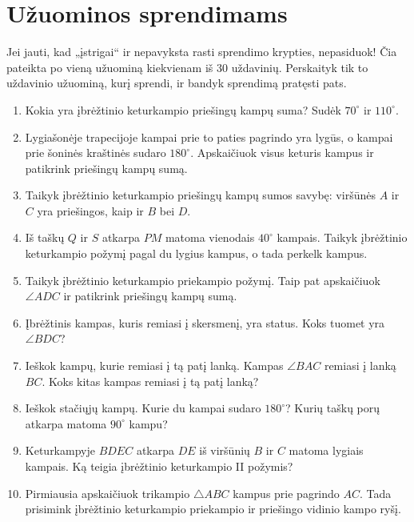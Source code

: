 \documentclass[11pt,a4paper]{scrartcl}
\begin{document}
\newpage
\section{Užuominos sprendimams}

Jei jauti, kad „įstrigai“ ir nepavyksta rasti sprendimo krypties, nepasiduok! Čia pateikta po vieną užuominą kiekvienam iš 30 uždavinių. Perskaityk tik to uždavinio užuominą, kurį sprendi, ir bandyk sprendimą pratęsti pats.

\begin{enumerate}
    \renewcommand{\labelenumi}{\textbf{\theenumi.}}

    \item Kokia yra įbrėžtinio keturkampio priešingų kampų suma? Sudėk $70^\circ$ ir $110^\circ$.
    \item Lygiašonėje trapecijoje kampai prie to paties pagrindo yra lygūs, o kampai prie šoninės kraštinės sudaro $180^\circ$. Apskaičiuok visus keturis kampus ir patikrink priešingų kampų sumą.
    \item Taikyk įbrėžtinio keturkampio priešingų kampų sumos savybę: viršūnės $A$ ir $C$ yra priešingos, kaip ir $B$ bei $D$.
    \item Iš taškų $Q$ ir $S$ atkarpa $PM$ matoma vienodais $40^\circ$ kampais. Taikyk įbrėžtinio keturkampio požymį pagal du lygius kampus, o tada perkelk kampus.
    \item Taikyk įbrėžtinio keturkampio priekampio požymį. Taip pat apskaičiuok $\angle ADC$ ir patikrink priešingų kampų sumą.
    \item Įbrėžtinis kampas, kuris remiasi į skersmenį, yra status. Koks tuomet yra $\angle BDC$?
    \item Ieškok kampų, kurie remiasi į tą patį lanką. Kampas $\angle BAC$ remiasi į lanką $BC$. Koks kitas kampas remiasi į tą patį lanką?
    \item Ieškok stačiųjų kampų. Kurie du kampai sudaro $180^\circ$? Kurių taškų porų atkarpa matoma $90^\circ$ kampu?
    \item Keturkampyje $BDEC$ atkarpa $DE$ iš viršūnių $B$ ir $C$ matoma lygiais kampais. Ką teigia įbrėžtinio keturkampio II požymis?
    \item Pirmiausia apskaičiuok trikampio $\triangle ABC$ kampus prie pagrindo $AC$. Tada prisimink įbrėžtinio keturkampio priekampio ir priešingo vidinio kampo ryšį.
\end{enumerate}
\end{document}
